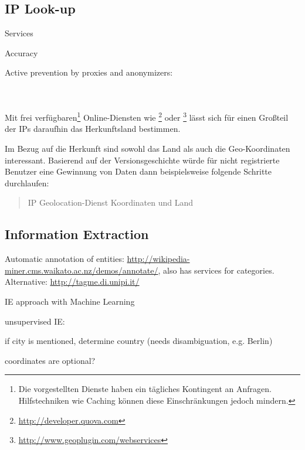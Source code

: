\subsection{IP Look-up}

\begin{todos}
    \item Services
    \item Accuracy
    \item Active prevention by proxies and anonymizers: 
    \\  
    \\ 
    \\ 
\end{todos}

Mit frei verfügbaren\footnote{Die vorgestellten Dienste haben ein tägliches Kontingent an Anfragen. Hilfstechniken wie Caching können diese Einschränkungen jedoch mindern.} Online-Diensten wie \footnote{\url{http://developer.quova.com}} oder \footnote{\url{http://www.geoplugin.com/webservices}} lässt sich für einen Großteil der IPs daraufhin das Herkunftsland bestimmen.

Im Bezug auf die Herkunft sind sowohl das Land als auch die Geo-Koordinaten interessant.  
Basierend auf der Versionsgeschichte würde für nicht registrierte Benutzer eine Gewinnung von Daten dann beispielsweise folgende Schritte durchlaufen:

\begin{quotation}
IP \RA Geolocation-Dienst \RA Koordinaten und Land
\end{quotation}


\subsection{Information Extraction}

\begin{todos}
\item Automatic annotation of entities: \url{http://wikipedia-miner.cms.waikato.ac.nz/demos/annotate/}, also has services for categories. Alternative: \url{http://tagme.di.unipi.it/}
    \item IE approach with Machine Learning 
    \item unsupervised IE: 
    \item if city is mentioned, determine country (needs disambiguation, e.g. Berlin)
    \item coordinates are optional?
\end{todos}

